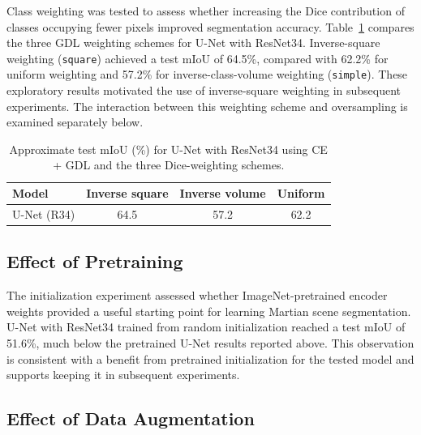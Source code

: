 Class weighting was tested to assess whether increasing the Dice contribution of classes occupying fewer pixels improved segmentation accuracy. Table~\ref{tab:s5mars-exploratory-dice-weighting} compares the three GDL weighting schemes for U-Net with ResNet34. Inverse-square weighting (\texttt{square}) achieved a test mIoU of 64.5\%, compared with 62.2\% for uniform weighting and 57.2\% for inverse-class-volume weighting (\texttt{simple}). These exploratory results motivated the use of inverse-square weighting in subsequent experiments. The interaction between this weighting scheme and oversampling is examined separately below.

\begin{table}[ht!]
    \centering
    \small
    \setlength{\tabcolsep}{5pt}
    \begin{tabular}{@{}l c c c@{}}
        \toprule
        \textbf{Model}   & \textbf{Inverse square} & \textbf{Inverse volume} & \textbf{Uniform} \\
        \midrule
        \midrule
        U-Net (R34) & 64.5                    & 57.2                    & 62.2             \\
        \bottomrule
    \end{tabular}
    \vspace{5mm}
    \caption{Approximate test mIoU (\%) for U-Net with ResNet34 using CE + GDL and the three Dice-weighting schemes.}
    \label{tab:s5mars-exploratory-dice-weighting}
\end{table}

\subsection{Effect of Pretraining}

The initialization experiment assessed whether ImageNet-pretrained encoder weights provided a useful starting point for learning Martian scene segmentation. U-Net with ResNet34 trained from random initialization reached a test mIoU of 51.6\%, much below the pretrained U-Net results reported above. This observation is consistent with a benefit from pretrained initialization for the tested model and supports keeping it in subsequent experiments.

\subsection{Effect of Data Augmentation}


